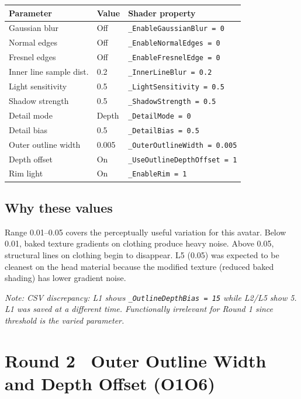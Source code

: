 \documentclass[11pt,a4paper]{article}
\newcommand{\prop}[1]{\texttt{#1}}
\newcommand{\note}[1]{{\small\color{notegray}\textit{Note: #1}}}
\begin{document}
\begin{tabular}{lll}
\toprule
\textbf{Parameter} & \textbf{Value} & \textbf{Shader property} \\
\midrule
Gaussian blur       & Off  & \prop{\_EnableGaussianBlur = 0} \\
Normal edges        & Off  & \prop{\_EnableNormalEdges = 0}  \\
Fresnel edges       & Off  & \prop{\_EnableFresnelEdge = 0}  \\
Inner line sample dist. & 0.2 & \prop{\_InnerLineBlur = 0.2} \\
Light sensitivity   & 0.5  & \prop{\_LightSensitivity = 0.5} \\
Shadow strength     & 0.5  & \prop{\_ShadowStrength = 0.5}   \\
Detail mode         & Depth & \prop{\_DetailMode = 0}         \\
Detail bias         & 0.5  & \prop{\_DetailBias = 0.5}       \\
Outer outline width & 0.005 & \prop{\_OuterOutlineWidth = 0.005} \\
Depth offset        & On   & \prop{\_UseOutlineDepthOffset = 1} \\
Rim light           & On   & \prop{\_EnableRim = 1}          \\
\bottomrule
\end{tabular}

\subsection*{Why these values}
Range 0.01--0.05 covers the perceptually useful variation for this avatar. Below 0.01, baked texture gradients on clothing produce heavy noise. Above 0.05, structural lines on clothing begin to disappear. L5 (0.05) was expected to be cleanest on the head material because the modified texture (reduced baked shading) has lower gradient noise.

\note{CSV discrepancy: L1 shows \prop{\_OutlineDepthBias = 15} while L2/L5 show 5. L1 was saved at a different time. Functionally irrelevant for Round 1 since threshold is the varied parameter.}

\bigskip

\section*{Round 2 \textemdash\ Outer Outline Width and Depth Offset (O1\textendash O6)}
\end{document}
